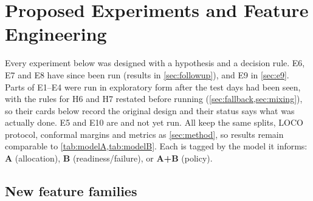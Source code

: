 \section{Proposed Experiments and Feature Engineering}
\label{sec:experiments}

Every experiment below was designed with a hypothesis and a decision rule. E6, E7 and E8 have since been run (results in \cref{sec:followup}), and E9 in \cref{sec:e9}. Parts of E1--E4 were run in exploratory form after the test days had been seen, with the rules for H6 and H7 restated before running (\cref{sec:fallback,sec:mixing}), so their cards below record the original design and their status says what was actually done. E5 and E10 are  and not yet run. All keep the same splits, LOCO protocol, conformal margins and metrics as \cref{sec:method}, so results remain comparable to \cref{tab:modelA,tab:modelB}. Each is tagged by the model it informs: \textbf{A} (allocation), \textbf{B} (readiness/failure), or \textbf{A+B} (policy).

\subsection{New feature families}

